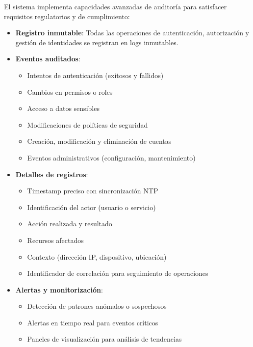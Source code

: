 \documentclass[12pt,a4paper]{article}
\begin{document}
El sistema implementa capacidades avanzadas de auditoría para satisfacer requisitos regulatorios y de cumplimiento:

\begin{itemize}
    \item \textbf{Registro inmutable}: Todas las operaciones de autenticación, autorización y gestión de identidades se registran en logs inmutables.
    
    \item \textbf{Eventos auditados}:
    \begin{itemize}
        \item Intentos de autenticación (exitosos y fallidos)
        \item Cambios en permisos o roles
        \item Acceso a datos sensibles
        \item Modificaciones de políticas de seguridad
        \item Creación, modificación y eliminación de cuentas
        \item Eventos administrativos (configuración, mantenimiento)
    \end{itemize}
    
    \item \textbf{Detalles de registros}:
    \begin{itemize}
        \item Timestamp preciso con sincronización NTP
        \item Identificación del actor (usuario o servicio)
        \item Acción realizada y resultado
        \item Recursos afectados
        \item Contexto (dirección IP, dispositivo, ubicación)
        \item Identificador de correlación para seguimiento de operaciones
    \end{itemize}
    
    \item \textbf{Alertas y monitorización}:
    \begin{itemize}
        \item Detección de patrones anómalos o sospechosos
        \item Alertas en tiempo real para eventos críticos
        \item Paneles de visualización para análisis de tendencias
    \end{itemize}
\end{itemize}
\end{document}
